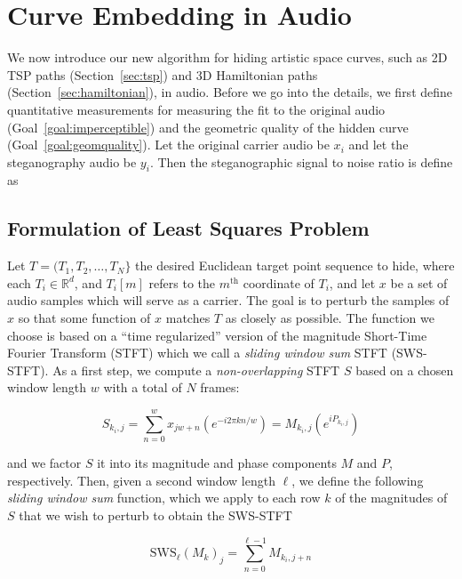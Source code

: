 \documentclass[runningheads]{llncs}
\begin{document}
\section{Curve Embedding in Audio}

We now introduce our new algorithm for hiding artistic space curves, such as 2D TSP paths (Section~\ref{sec:tsp}) and 3D Hamiltonian paths (Section~\ref{sec:hamiltonian}), in audio.  Before we go into the details, we first define quantitative measurements for measuring the fit to the original audio (Goal~\ref{goal:imperceptible}) and the geometric quality of the hidden curve (Goal~\ref{goal:geomquality}).  Let the original carrier audio be $x_i$ and let the steganography audio be $y_i$.  Then the steganographic signal to noise ratio is define as   

\subsection{Formulation of Least Squares Problem}

Let $T = (T_1, T_2, \hdots, T_N \}$ the desired Euclidean target point sequence to hide, where each $T_i \in \mathbb{R}^d$, and $T_i[m]$ refers to the $m^{\text{th}}$ coordinate of $T_i$, and let $x$ be a set of audio samples which will serve as a carrier.  The goal is to perturb the samples of $x$ so that some function of $x$ matches $T$ as closely as possible.  The function we choose is based on a ``time regularized'' version of the magnitude Short-Time Fourier Transform (STFT) which we call a {\em sliding window sum} STFT (SWS-STFT).  As a first step, we compute a {\em non-overlapping} STFT $S$ based on a chosen window length $w$ with a total of $N$ frames:

\begin{equation}
  S_{k_i, j} = \sum_{n = 0}^w x_{jw + n} \left(e^{-i 2 \pi k n / w} \right) = M_{k_i, j} \left( e^{i P_{k_i, j}} \right)
\end{equation}

and we factor $S$ it into its magnitude and phase components $M$ and $P$, respectively.  Then, given a second window length $\ell$, we define the following {\em sliding window sum} function, which we apply to each row $k$ of the magnitudes of $S$ that we wish to perturb to obtain the SWS-STFT

\begin{equation}
  \text{SWS}_{\ell}\left({M_k}\right)_j = \sum_{n = 0}^{\ell-1} M_{k_i, j+n}
\end{equation}
\end{document}
